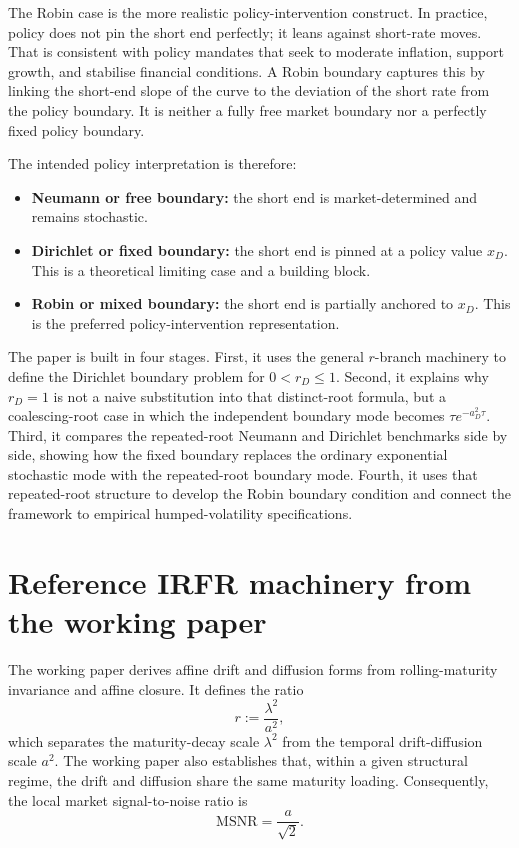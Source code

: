 \documentclass[11pt]{article}
\newcommand{\MSNR}{\mathrm{MSNR}}
\numberwithin{equation}{section}
\begin{document}
The Robin case is the more realistic policy-intervention construct. In practice, policy does not pin the short end perfectly; it leans against short-rate moves. That is consistent with policy mandates that seek to moderate inflation, support growth, and stabilise financial conditions. A Robin boundary captures this by linking the short-end slope of the curve to the deviation of the short rate from the policy boundary. It is neither a fully free market boundary nor a perfectly fixed policy boundary.

The intended policy interpretation is therefore:
\begin{itemize}
  \item \textbf{Neumann or free boundary:} the short end is market-determined and remains stochastic.
  \item \textbf{Dirichlet or fixed boundary:} the short end is pinned at a policy value $x_D$. This is a theoretical limiting case and a building block.
  \item \textbf{Robin or mixed boundary:} the short end is partially anchored to $x_D$. This is the preferred policy-intervention representation.
\end{itemize}

The paper is built in four stages. First, it uses the general $r$-branch machinery to define the Dirichlet boundary problem for $0<r_D\leq 1$. Second, it explains why $r_D=1$ is not a naive substitution into that distinct-root formula, but a coalescing-root case in which the independent boundary mode becomes $\tau e^{-a_D^2\tau}$. Third, it compares the repeated-root Neumann and Dirichlet benchmarks side by side, showing how the fixed boundary replaces the ordinary exponential stochastic mode with the repeated-root boundary mode. Fourth, it uses that repeated-root structure to develop the Robin boundary condition and connect the framework to empirical humped-volatility specifications.

\section{Reference IRFR machinery from the working paper}

The working paper derives affine drift and diffusion forms from rolling-maturity invariance and affine closure. It defines the ratio
\begin{equation}
\label{eq:r-ratio}
r:=\frac{\lambda^2}{a^2},
\end{equation}
which separates the maturity-decay scale $\lambda^2$ from the temporal drift-diffusion scale $a^2$. The working paper also establishes that, within a given structural regime, the drift and diffusion share the same maturity loading. Consequently, the local market signal-to-noise ratio is
\begin{equation}
\label{eq:within-regime-msnr}
\MSNR=\frac{a}{\sqrt{2}}.
\end{equation}
\end{document}
